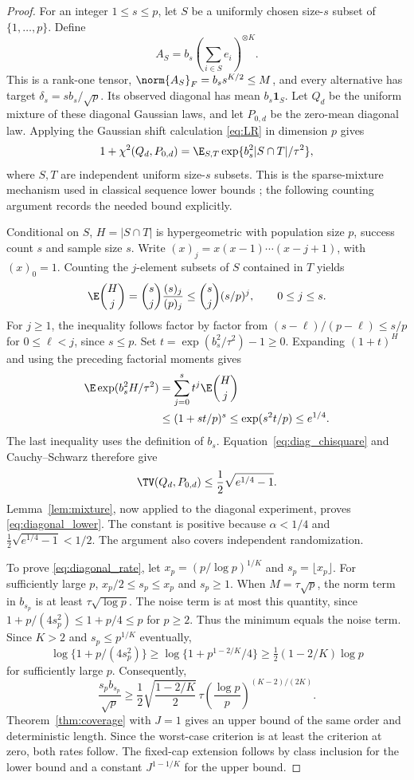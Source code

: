 \begin{proof}
For an integer $1\le s\le p$, let $S$ be a uniformly chosen size-$s$ subset of $\{1,\ldots,p\}$. Define
\[
 A_S=b_s\left(\sum_{i\in S}e_i\right)^{\otimes K}.
\]
This is a rank-one tensor, $\norm{A_S}_F=b_s s^{K/2}\le M$, and every alternative has target $\delta_s=s b_s/\sqrt p$. Its observed diagonal has mean $b_s\mathbf1_S$. Let $Q_d$ be the uniform mixture of these diagonal Gaussian laws, and let $P_{0,d}$ be the zero-mean diagonal law. Applying the Gaussian shift calculation \eqref{eq:LR} in dimension $p$ gives
\begin{equation}\label{eq:diag_chisquare}
 1+\chi^2(Q_d,P_{0,d})
 =\E_{S,T}\exp\{b_s^2|S\cap T|/\tau^2\},
\end{equation}
where $S,T$ are independent uniform size-$s$ subsets. This is the sparse-mixture mechanism used in classical sequence lower bounds \citep{collier2017}; the following counting argument records the needed bound explicitly.

Conditional on $S$, $H=|S\cap T|$ is hypergeometric with population size $p$, success count $s$ and sample size $s$. Write $(x)_j=x(x-1)\cdots(x-j+1)$, with $(x)_0=1$. Counting the $j$-element subsets of $S$ contained in $T$ yields
\[
 \E\binom Hj=\binom sj\frac{(s)_j}{(p)_j}
 \le\binom sj(s/p)^j,\qquad 0\le j\le s.
\]
For $j\ge1$, the inequality follows factor by factor from
$(s-\ell)/(p-\ell)\le s/p$ for $0\le\ell<j$, since $s\le p$.
Set $t=\exp(b_s^2/\tau^2)-1\ge0$. Expanding $(1+t)^H$ and using the preceding factorial moments gives
\begin{align*}
 \E\exp(b_s^2H/\tau^2)
 &=\sum_{j=0}^s t^j\E\binom Hj\\
 &\le (1+st/p)^s
 \le \exp(s^2t/p)
 \le e^{1/4}.
\end{align*}
The last inequality uses the definition of $b_s$. Equation~\eqref{eq:diag_chisquare} and Cauchy--Schwarz therefore give
\[
 \TV(Q_d,P_{0,d})\le\frac12\sqrt{e^{1/4}-1}.
\]
Lemma~\ref{lem:mixture}, now applied to the diagonal experiment, proves \eqref{eq:diagonal_lower}. The constant is positive because $\alpha<1/4$ and $\frac12\sqrt{e^{1/4}-1}<1/2$. The argument also covers independent randomization.

To prove \eqref{eq:diagonal_rate}, let
$x_p=(p/\log p)^{1/K}$ and $s_p=\lfloor x_p\rfloor$. For sufficiently large $p$,
$x_p/2\le s_p\le x_p$ and $s_p\ge1$. When $M=\tau\sqrt p$, the norm term in $b_{s_p}$ is at least $\tau\sqrt{\log p}$. The noise term is at most this quantity, since $1+p/(4s_p^2)\le1+p/4\le p$ for $p\ge2$. Thus the minimum equals the noise term. Since $K>2$ and $s_p\le p^{1/K}$ eventually,
\[
 \log\{1+p/(4s_p^2)\}
 \ge\log\{1+p^{1-2/K}/4\}
 \ge\tfrac12(1-2/K)\log p
\]
for sufficiently large $p$. Consequently,
\[
 \frac{s_p b_{s_p}}{\sqrt p}
 \ge \frac12\sqrt{\frac{1-2/K}{2}}\,
 \tau\left(\frac{\log p}{p}\right)^{(K-2)/(2K)}.
\]
Theorem~\ref{thm:coverage} with $J=1$ gives an upper bound of the same order and deterministic length. Since the worst-case criterion is at least the criterion at zero, both rates follow. The fixed-cap extension follows by class inclusion for the lower bound and a constant $J^{1-1/K}$ for the upper bound.


\end{proof}
